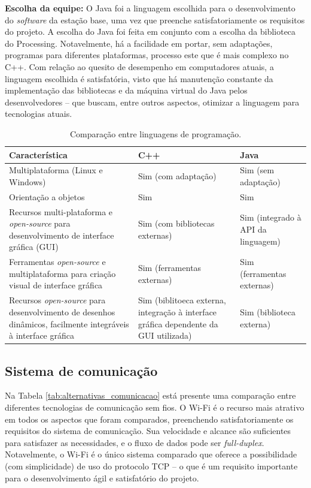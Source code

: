 \textbf{Escolha da equipe:} O Java foi a linguagem escolhida para o desenvolvimento do \textit{software} da estação base, uma vez que preenche satisfatoriamente os requisitos do projeto. A escolha do Java foi feita em conjunto com a escolha da biblioteca do Processing. Notavelmente, há a facilidade em portar, sem adaptações, programas para diferentes plataformas, processo este que é mais complexo no C++.  Com relação ao quesito de desempenho em computadores atuais, a linguagem escolhida é satisfatória, visto que há manutenção constante da implementação das bibliotecas e da máquina virtual do Java pelos desenvolvedores -- que buscam, entre outros aspectos, otimizar a linguagem para tecnologias atuais.

\begin{table}[h]
  \caption{Comparação entre linguagens de programação.}
  \centering
  \begin{tabular}{p{6cm}|p{4cm}p{4cm}}
    \toprule
    \textbf{Característica} & \textbf{C++} & \textbf{Java} \\
    \hline
    Multiplataforma (Linux e Windows) & Sim (com adaptação) & Sim (sem adaptação) \\
    \hline
    Orientação a objetos & Sim & Sim \\
    \hline
    Recursos multi-plataforma e \textit{open-source} para desenvolvimento de interface gráfica (GUI) & Sim (com bibliotecas externas) & Sim (integrado à API da linguagem) \\
    \hline
    Ferramentas \textit{open-source} e multiplataforma para criação visual de interface gráfica & Sim (ferramentas externas) & Sim (ferramentas externas) \\
    \hline
    Recursos \textit{open-source} para desenvolvimento de desenhos dinâmicos, facilmente integráveis à interface gráfica & Sim (biblitoeca externa, integração à interface gráfica dependente da GUI utilizada) & Sim (biblioteca externa) \\
    \bottomrule
  \end{tabular}
  \label{tab:alternativas_linguagens}
\end{table}



\subsection{Sistema de comunicação}

Na Tabela \ref{tab:alternativas_comunicacao} está presente uma comparação entre diferentes tecnologias de comunicação sem fios. O Wi-Fi é o recurso mais atrativo em todos os aspectos que foram comparados, preenchendo satisfatoriamente os requisitos do sistema de comunicação. Sua velocidade e alcance são suficientes para satisfazer as necessidades, e o fluxo de dados pode ser \textit{full-duplex}. Notavelmente, o Wi-Fi é o único sistema comparado que oferece a possibilidade (com simplicidade) de uso do protocolo TCP -- o que é um requisito importante para o desenvolvimento ágil e satisfatório do projeto.


